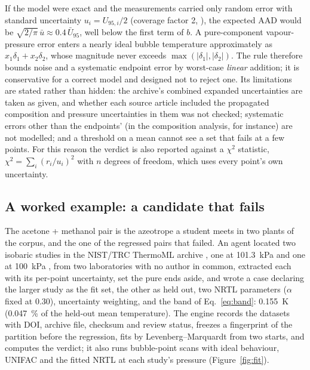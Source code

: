 \documentclass[preprint,12pt]{elsarticle}
\begin{document}
If the model were exact and the measurements carried only random error
with standard uncertainty $u_i = U_{95,i}/2$ (coverage factor 2,
\citet{jcgm2008}), the expected AAD would be
$\sqrt{2/\pi}\,\bar u \approx 0.4\,\bar U_{95}$, well below the first term
of $b$.  A pure-component vapour-pressure error enters a nearly ideal
bubble temperature approximately as $x_1\delta_1 + x_2\delta_2$, whose
magnitude never exceeds $\max(|\delta_1|,|\delta_2|)$.  The rule therefore
bounds noise and a systematic endpoint error by worst-case
\emph{linear} addition; it is conservative for a correct model and
designed not to reject one.  Its limitations are stated rather than
hidden: the archive's combined expanded uncertainties are taken as given,
and whether each source article included the propagated composition and
pressure uncertainties in them was not checked; systematic errors other
than the endpoints' (in the composition analysis, for instance) are not
modelled; and a threshold on a mean cannot see a set that fails at a few
points.  For this reason the verdict is also reported against a
$\chi^2$ statistic, $\chi^2 = \sum_i (r_i/u_i)^2$ with $n$ degrees of
freedom, which uses every point's own uncertainty.

\subsection{A worked example: a candidate that fails}
\label{sec:worked}

The acetone + methanol pair is the azeotrope a student meets in two plants
of the corpus, and the one of the regressed pairs that failed.  An agent
located two isobaric studies in the NIST/TRC ThermoML archive
\citep{frenkel2003}, one at 101.3~kPa \citep{chen2015} and one at 100~kPa
\citep{orchilles2007}, from two laboratories with no author in common,
extracted each with its per-point uncertainty, set the pure ends aside,
and wrote a case declaring the larger study as the fit set, the other as
held out, two NRTL parameters ($\alpha$ fixed at 0.30), uncertainty
weighting, and the band of Eq.~\eqref{eq:band}: 0.155~K (0.047~\% of the
held-out mean temperature).  The engine records the datasets with DOI,
archive file, checksum and review status, freezes a fingerprint of the
partition before the regression, fits by Levenberg--Marquardt from two
starts, and computes the verdict; it also runs bubble-point scans with
ideal behaviour, UNIFAC \citep{fredenslund1975} and the fitted NRTL
\citep{renon1968} at each study's pressure (Figure~\ref{fig:fit}).
\end{document}
